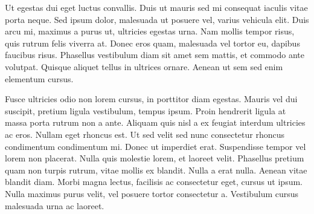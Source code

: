 Ut egestas dui eget luctus convallis. Duis ut mauris sed mi consequat iaculis vitae porta neque. Sed ipsum dolor, malesuada ut posuere vel, varius vehicula elit. Duis arcu mi, maximus a purus ut, ultricies egestas urna. Nam mollis tempor risus, quis rutrum felis viverra at. Donec eros quam, malesuada vel tortor eu, dapibus faucibus risus. Phasellus vestibulum diam sit amet sem mattis, et commodo ante volutpat. Quisque aliquet tellus in ultrices ornare. Aenean ut sem sed enim elementum cursus.

Fusce ultricies odio non lorem cursus, in porttitor diam egestas. Mauris vel dui suscipit, pretium ligula vestibulum, tempus ipsum. Proin hendrerit ligula at massa porta rutrum non a ante. Aliquam quis nisl a ex feugiat interdum ultricies ac eros. Nullam eget rhoncus est. Ut sed velit sed nunc consectetur rhoncus condimentum condimentum mi. Donec ut imperdiet erat. Suspendisse tempor vel lorem non placerat. Nulla quis molestie lorem, et laoreet velit. Phasellus pretium quam non turpis rutrum, vitae mollis ex blandit. Nulla a erat nulla. Aenean vitae blandit diam. Morbi magna lectus, facilisis ac consectetur eget, cursus ut ipsum. Nulla maximus purus velit, vel posuere tortor consectetur a. Vestibulum cursus malesuada urna ac laoreet. 